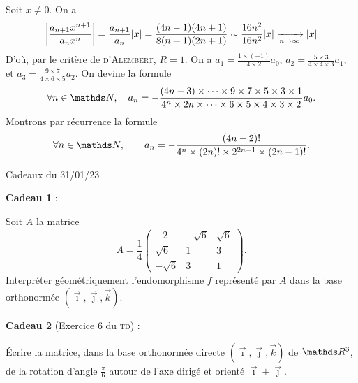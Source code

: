 \documentclass[a4paper]{article}
\begin{document}
	Soit $x \neq 0$. On a
	\begin{align*}
		\left| \frac{a_{n+1} x^{n+1}}{a_n x^n} \right| = \frac{a_{n+1}}{a_n} |x| = \frac{(4n - 1)(4n+1)}{8(n+1)(2n+1)} \sim \frac{16n^2}{16n^2} |x| \xrightarrow[n\to \infty]{} |x|
	\end{align*}
	D'où, par le critère de \textsc{d'Alembert}, $R = 1$.
	On a $a_1 = \frac{1 \times (-1)}{4 \times  2} a_0$, $a_2 = \frac{5 \times  3}{4 \times  4 \times  3} a_1$, et $a_3 = \frac{9 \times 7}{4 \times 6 \times 5} a_2$.
	On devine la formule \[
		\forall n \in \N, \quad a_n = -\frac{(4n -3) \times \cdots \times 9 \times 7 \times 5 \times 3 \times 1}{4^n \times 2n \times \cdots \times 6 \times  5 \times  4 \times  3 \times 2} a_0
	.\] 
	Montrons par récurrence la formule \[
		\forall n \in \N,\quad\quad a_n = - \frac{(4n -2)!}{4^n \times (2n)! \times 2^{2n - 1} \times (2n-1)!}
	.\]
	\clearpage
	\centerline{\LARGE Cadeaux du 31/01/23}

	\bigskip
	\bigskip
	\bigskip
	\textbf{Cadeau 1} :\\
	\begin{slshape}
		Soit $A$\/ la matrice \[
			A = \frac{1}{4} \begin{pmatrix}
				-2 & -\sqrt{6} & \sqrt{6} \\
				\sqrt{6} & 1 & 3\\
				-\sqrt{6} & 3 & 1
			\end{pmatrix}
		.\]
		Interpréter géométriquement l'endomorphisme $f$\/ représenté par $A$\/ dans la base orthonormée $(\vec{\imath}, \vec{\jmath}, \vec{k})$.

	\end{slshape}

	\bigskip

	\textbf{Cadeau 2} (Exercice 6 du \textsc{td}) :\\
	\begin{slshape}
		Écrire la matrice, dans la base orthonormée directe $(\vec{\imath}, \vec{\jmath}, \vec{k})$ de $\R^3$, de la rotation d'angle $\frac{\pi}{6}$\/ autour de l'axe dirigé et orienté $\vec{\imath} + \vec{\jmath}$.
	\end{slshape}
\end{document}

